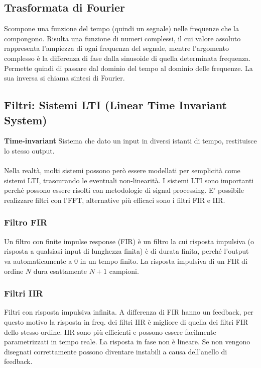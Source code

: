 \documentclass[8pt,a4paper]{article}
\begin{document}
\begin{multicols}{5}
    \subsection{Trasformata di Fourier}
    Scompone una funzione del tempo (quindi un segnale) nelle frequenze che la
    compongono. Risulta una funzione di numeri complessi, il cui valore assoluto
    rappresenta l'ampiezza di ogni frequenza del segnale, mentre l'argomento
    complesso è la differenza di fase dalla sinusoide di quella determinata frequenza.\\
    Permette quindi di passare dal dominio del tempo al dominio delle frequenze.
    La sua inversa si chiama sintesi di Fourier.

    \subsection{Filtri: Sistemi LTI (Linear Time Invariant System)}
    \textbf{Time-invariant} Sistema che dato un input in diversi istanti di tempo, 
    restituisce lo stesso output. \\ \\ 
    Nella realtà, molti sistemi possono però essere modellati per semplicità come 
    sistemi LTI, trascurando le eventuali non-linearità. I sistemi LTI sono importanti 
    perché possono essere risolti con metodologie di signal processing. E’ possibile 
    realizzare filtri con l’FFT, alternative più efficaci sono i filtri FIR e IIR.


    \subsubsection{Filtro FIR}
    Un filtro con finite impulse response (FIR) è un filtro la cui risposta
    impulsiva (o risposta a qualsiasi input di lunghezza finita) è di durata finita,
    perché l'output va automaticamente a 0 in un tempo finito.
    La risposta impulsiva di un FIR di ordine $N$ dura esattamente $N + 1$ campioni.

    \subsubsection{Filtri IIR}
    Filtri con risposta impulsiva infinita. A differenza di FIR hanno un feedback,
    per questo motivo la risposta in freq. dei filtri IIR è migliore di quella dei
    filtri FIR dello stesso ordine.
    IIR sono più efficienti e possono essere facilmente parametrizzati in tempo reale.
    La risposta in fase non è lineare. Se non vengono disegnati correttamente possono
    diventare instabili a causa dell'anello di feedback.


\end{multicols}
\end{document}
